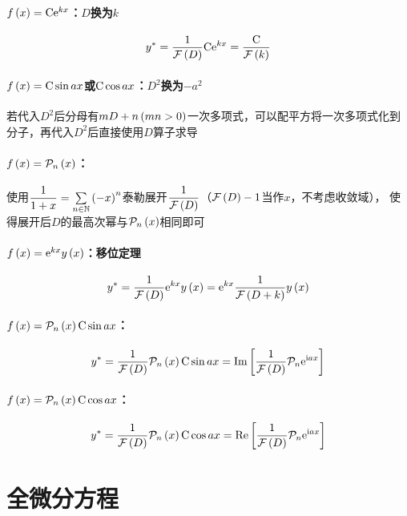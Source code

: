 \documentclass{article}
\begin{document}
\paragraph{$f\left(x\right)=\mathrm C\mathrm e^{kx}$：$D$换为$k$}

\[y^*=\frac1{\mathcal F\left(D\right)}\mathrm C\mathrm e^{kx}=\frac{\mathrm C}{\mathcal F\left(k\right)}\]

\paragraph{$f\left(x\right)=\mathrm C\sin ax$或$\mathrm C\cos ax$：$D^2$换为$-a^2$}

若代入$D^2$后分母有$mD+n\left(mn>0\right)$一次多项式，可以配平方将一次多项式化到分子，再代入$D^2$后直接使用$D$算子求导

\paragraph{$f\left(x\right)=\mathcal P_n\left(x\right)$：}

使用$\dfrac1{1+x}=\sum\limits_{n\in\mathbb N}\left(-x\right)^n$泰勒展开$\dfrac1{\mathcal F\left(D\right)}$（$\mathcal F\left(D\right)-1$当作$x$，不考虑收敛域），
使得展开后$D$的最高次幂与$\mathcal P_n\left(x\right)$相同即可

\paragraph{$f\left(x\right)=\mathrm e^{kx}y\left(x\right)$：移位定理}

\[y^*=\frac1{\mathcal F\left(D\right)}\mathrm e^{kx}y\left(x\right)=\mathrm e^{kx}\frac1{\mathcal F\left(D+k\right)}y\left(x\right)\]

\paragraph{$f\left(x\right)=\mathcal P_n\left(x\right)\mathrm C\sin ax$：}

\[y^*=\frac1{\mathcal F\left(D\right)}\mathcal P_n\left(x\right)\mathrm C\sin ax=\operatorname{Im}\left[{\frac1{\mathcal F\left(D\right)}\mathcal P_n\mathrm e^{\mathrm i ax}}\right]\]

\paragraph{$f\left(x\right)=\mathcal P_n\left(x\right)\mathrm C\cos ax$：}

\[y^*=\frac1{\mathcal F\left(D\right)}\mathcal P_n\left(x\right)\mathrm C\cos ax=\operatorname{Re}\left[{\frac1{\mathcal F\left(D\right)}\mathcal P_n\mathrm e^{\mathrm i ax}}\right]\]

\section{全微分方程}
\end{document}
